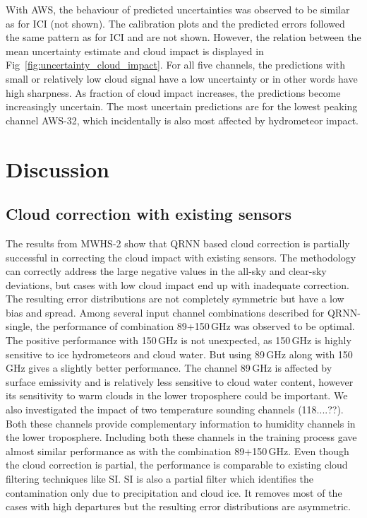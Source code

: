 \documentclass[amt, manuscript]{copernicus}
\begin{document}
With AWS, the behaviour of predicted uncertainties was observed to be similar as for ICI (not shown). The calibration plots and the predicted errors followed the same pattern as for ICI and are not shown. However, the relation between the mean uncertainty estimate and cloud impact is displayed in Fig~\ref{fig:uncertainty_cloud_impact}. For all five channels, the predictions with small or relatively low cloud signal have a low uncertainty or in other words have high sharpness. As fraction of cloud impact increases, the predictions become increasingly uncertain. The most uncertain predictions are for the lowest peaking channel AWS-32, which incidentally is also most affected by  hydrometeor impact.  

\section{Discussion}

\subsection{Cloud correction with existing sensors}
%
The results from MWHS-2 show that QRNN based cloud correction is partially successful in correcting the cloud impact with existing sensors. The methodology can correctly address the large negative values in the all-sky and clear-sky deviations, but cases with low cloud impact end up with inadequate correction. The resulting error distributions are not completely symmetric but have a low bias and spread. Among several input channel combinations described for QRNN-single, the performance of combination 89+150\,GHz was observed to be optimal. The positive performance with 150\,GHz is not unexpected, as 150\,GHz is highly sensitive to ice hydrometeors and cloud water. But using 89\,GHz along with 150\,GHz gives a slightly better performance. The channel 89\,GHz is affected by surface emissivity and is relatively less sensitive to cloud water content, however its sensitivity to warm clouds in the lower troposphere could be important. We also investigated the impact of two temperature sounding channels (118....??). Both these channels provide complementary information to humidity channels in the lower troposphere. Including both these channels in the training process gave almost similar performance as with the combination 89+150\,GHz. Even though the cloud correction is partial, the performance is comparable to existing cloud filtering techniques like SI.  SI is also a partial filter which identifies the contamination only due to precipitation and cloud ice. It removes most of the cases with high departures but the resulting error distributions are asymmetric.
\end{document}
